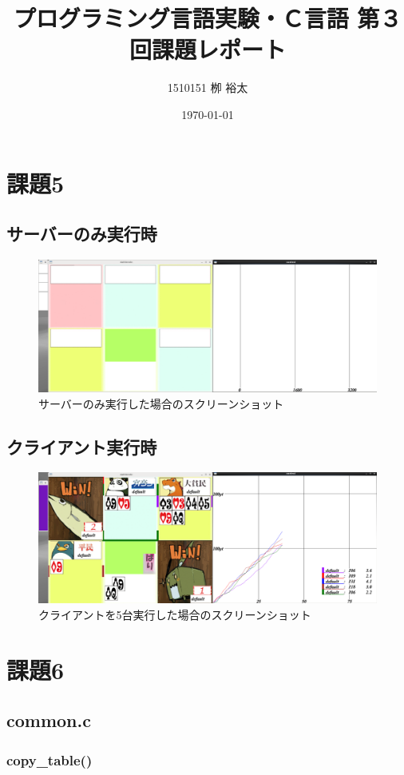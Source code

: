 \documentclass[11pt,a4paper, uplatex]{jsarticle}
\title{プログラミング言語実験・Ｃ言語 第３回課題レポート}
\author{1510151  栁 裕太}
\date{\today}
\begin{document}
\section{課題5}
%
\subsection{サーバーのみ実行時}

\begin{figure}[h]
  \centering
  \caption{サーバーのみ実行した場合のスクリーンショット}
  \includegraphics[width=120mm]{ex5-scs.png}
\end{figure}
\subsection{クライアント実行時}

\begin{figure}[h]
  \centering
  \caption{クライアントを5台実行した場合のスクリーンショット}
  \includegraphics[width=120mm]{./ex5-scs2.png}
\end{figure}

\section{課題6}
%
\subsection{common.c}
%
\subsubsection{copy\_table()}
\end{document}
